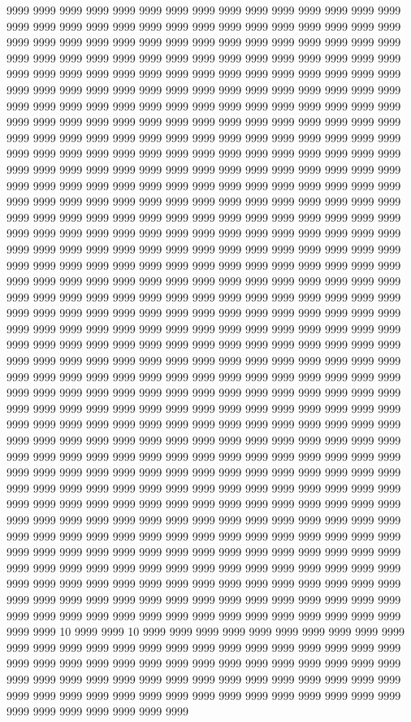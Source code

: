 9999 9999 9999 9999 9999 9999 9999 9999 9999 9999 9999 9999 9999 9999 9999 9999 9999 9999 9999 9999 9999 9999 9999 9999 9999 9999 9999 9999 9999 9999 9999 9999 9999 9999 9999 9999 9999 9999 9999 9999 9999 9999 9999 9999 9999 9999 9999 9999 9999 9999 9999 9999 9999 9999 9999 9999 9999 9999 9999 9999 9999 9999 9999 9999 9999 9999 9999 9999 9999 9999 9999 9999 9999 9999 9999 9999 9999 9999 9999 9999 9999 9999 9999 9999 9999 9999 9999 9999 9999 9999 9999 9999 9999 9999 9999 9999 9999 9999 9999 9999 9999 9999 9999 9999 9999 9999 9999 9999 9999 9999 9999 9999 9999 9999 9999 9999 9999 9999 9999 9999 9999 9999 9999 9999 9999 9999 9999 9999 9999 9999 9999 9999 9999 9999 9999 9999 9999 9999 9999 9999 9999 9999 9999 9999 9999 9999 9999 9999 9999 9999 9999 9999 9999 9999 9999 9999 9999 9999 9999 9999 9999 9999 9999 9999 9999 9999 9999 9999 9999 9999 9999 9999 9999 9999 9999 9999 9999 9999 9999 9999 9999 9999 9999 9999 9999 9999 9999 9999 9999 9999 9999 9999 9999 9999 9999 9999 9999 9999 9999 9999 9999 9999 9999 9999 9999 9999 9999 9999 9999 9999 9999 9999 9999 9999 9999 9999 9999 9999 9999 9999 9999 9999 9999 9999 9999 9999 9999 9999 9999 9999 9999 9999 9999 9999 9999 9999 9999 9999 9999 9999 9999 9999 9999 9999 9999 9999 9999 9999 9999 9999 9999 9999 9999 9999 9999 9999 9999 9999 9999 9999 9999 9999 9999 9999 9999 9999 9999 9999 9999 9999 9999 9999 9999 9999 9999 9999 9999 9999 9999 9999 9999 9999 9999 9999 9999 9999 9999 9999 9999 9999 9999 9999 9999 9999 9999 9999 9999 9999 9999 9999 9999 9999 9999 9999 9999 9999 9999 9999 9999 9999 9999 9999 9999 9999 9999 9999 9999 9999 9999 9999 9999 9999 9999 9999 9999 9999 9999 9999 9999 9999 9999 9999 9999 9999 9999 9999 9999 9999 9999 9999 9999 9999 9999 9999 9999 9999 9999 9999 9999 9999 9999 9999 9999 9999 9999 9999 9999 9999 9999 9999 9999 9999 9999 9999 9999 9999 9999 9999 9999 9999 9999 9999 9999 9999 9999 9999 9999 9999 9999 9999 9999 9999 9999 9999 9999 9999 9999 9999 9999 9999 9999 9999 9999 9999 9999 9999 9999 9999 9999 9999 9999 9999 9999 9999 9999 9999 9999 9999 9999 9999 9999 9999 9999 9999 9999 9999 9999 9999 9999 9999 9999 9999 9999 9999 9999 9999 9999 9999 9999 9999 9999 9999 9999 9999 9999 9999 9999 9999 9999 9999 9999 9999 9999 9999 9999 9999 9999 9999 9999 9999 9999 9999 9999 9999 9999 9999 9999 9999 9999 9999 9999 9999 9999 9999 9999 9999 9999 9999 9999 9999 9999 9999 9999 9999 9999 9999 9999 9999 9999 9999 9999 9999 9999 9999 9999 9999 9999 9999 9999 9999 9999 9999 9999 9999 9999 9999 9999 9999 9999 9999 9999 9999 9999 9999 9999 9999 9999 9999 9999 9999 9999 9999 9999 9999 9999 9999 9999 9999 9999 9999 9999 9999 9999 9999 9999 9999 9999 9999 9999 9999 9999 9999 9999 9999 9999 9999 9999 9999 9999 9999 9999 9999 9999 9999 9999 9999 9999 9999 9999 9999 9999 9999 9999 9999 9999 9999 9999 9999 9999 9999 9999 9999 9999 9999 9999 9999 9999 9999 9999 9999 9999 9999 9999 9999 9999 9999 9999 9999 9999 9999 9999 9999 9999 9999 9999 9999 9999 10 9999 9999 10 9999 9999 9999 9999 9999 9999 9999 9999 9999 9999 9999 9999 9999 9999 9999 9999 9999 9999 9999 9999 9999 9999 9999 9999 9999 9999 9999 9999 9999 9999 9999 9999 9999 9999 9999 9999 9999 9999 9999 9999 9999 9999 9999 9999 9999 9999 9999 9999 9999 9999 9999 9999 9999 9999 9999 9999 9999 9999 9999 9999 9999 9999 9999 9999 9999 9999 9999 9999 9999 9999 9999 9999 9999 9999 9999 9999 9999 